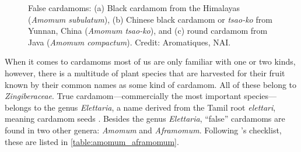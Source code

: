 \begin{figure}[!ht]
	\vspace{-2ex}
	\centering
    \hfill
    \hfill
	\caption[False cardamoms]{False cardamoms: (a) Black cardamom from the Himalayas (\textit{Amomum subulatum}), (b) Chinese black cardamom or \textit{tsao-ko} from Yunnan, China (\textit{Amomum tsao-ko}), and (c) round cardamom from Java (\textit{Amomum compactum}). Credit: Aromatiques, NAI.}
	\label{fig:black_cardamom_imgs}
\end{figure}

When it comes to cardamoms most of us are only familiar with one or two kinds, however, there is a multitude of plant species that are harvested for their fruit known by their common names as some kind of cardamom. All of these belong to \textit{Zingiberaceae}. True cardamom---commercially the most important species---belongs to the genus \textit{Elettaria}, a name derived from the Tamil root \textit{elettari}, meaning cardamom seeds \autocite[1]{ravindran_cardamom_2002}. Besides the genus \textit{Elettaria}, ``false'' cardamoms are found in two other genera: \textit{Amomum} and \textit{Aframomum}. Following \textcite[290-308]{van_wyk_culinary_2014}'s checklist, these are listed in \cref{table:amomum_aframomum}.

